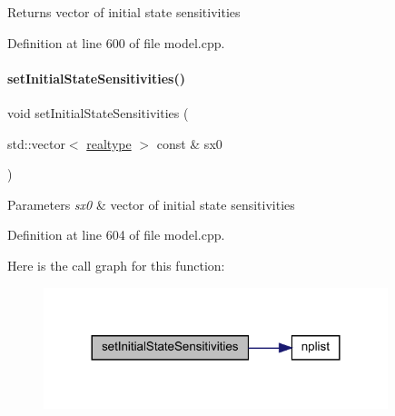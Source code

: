 \begin{DoxyReturn}{Returns}
vector of initial state sensitivities 
\end{DoxyReturn}


Definition at line 600 of file model.\+cpp.

\mbox{\label{classamici_1_1_model_a82941b121d9db31d357642092a2cd41d}} 
\paragraph{\texorpdfstring{set\+Initial\+State\+Sensitivities()}{setInitialStateSensitivities()}}
{\footnotesize\ttfamily void set\+Initial\+State\+Sensitivities (\begin{DoxyParamCaption}\item[{std\+::vector$<$ \mbox{\hyperlink{namespaceamici_a1bdce28051d6a53868f7ccbf5f2c14a3}{realtype}} $>$ const \&}]{sx0 }\end{DoxyParamCaption})}


\begin{DoxyParams}{Parameters}
{\em sx0} & vector of initial state sensitivities \\
\hline
\end{DoxyParams}


Definition at line 604 of file model.\+cpp.

Here is the call graph for this function\+:
\nopagebreak
\begin{figure}[H]
\begin{center}
\leavevmode
\includegraphics[width=284pt]{classamici_1_1_model_a82941b121d9db31d357642092a2cd41d_cgraph}
\end{center}
\end{figure}
\mbox{\label{classamici_1_1_model_a223e567004c82b5facc2fe98cdd16855}} 
